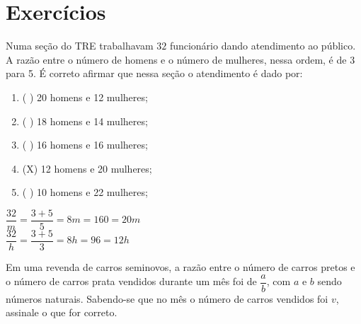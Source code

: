 \section{Exercícios}

Numa seção do TRE trabalhavam $ 32 $ funcionário dando atendimento ao público. A razão entre o número de homens e o número de mulheres, nessa ordem, é de 3 para 5. É correto afirmar que nessa seção o atendimento é dado por:

\begin{multicols}{2}
\begin{enumerate}[label=\alph*)]
	\item ( ) 20 homens e 12 mulheres;
	\item ( ) 18 homens e 14 mulheres;
	\item ( ) 16 homens e 16 mulheres;
	\item (X) 12 homens e 20 mulheres;
	\item ( ) 10 homens e 22 mulheres;
\end{enumerate}
\columnbreak

$ \dfrac{32}{m} = \dfrac{3+5}{5} = 8m = 160 = 20m$\\

$ \dfrac{32}{h} = \dfrac{3+5}{3} = 8h = 96 = 12h $
\end{multicols}

Em uma revenda de carros seminovos, a razão entre o número de carros pretos e o número de carros prata vendidos durante um mês foi de $ \dfrac{a}{b}$, com $ a $ e $ b $ sendo números naturais. Sabendo-se que no mês o número de carros vendidos foi $ v $, assinale o que for correto.


